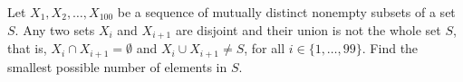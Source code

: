 Let $X_1, X_2, \ldots, X_{100}$ be a sequence of mutually distinct nonempty subsets of a set $S$.  Any two sets $X_i$ and $X_{i+1}$ are disjoint and their union is not the whole set $S$, that is, $X_i\cap X_{i+1}=\emptyset$ and $X_i\cup X_{i+1}\neq S$, for all $i\in\{1, \ldots, 99\}$.  Find the smallest possible number of elements in $S$.